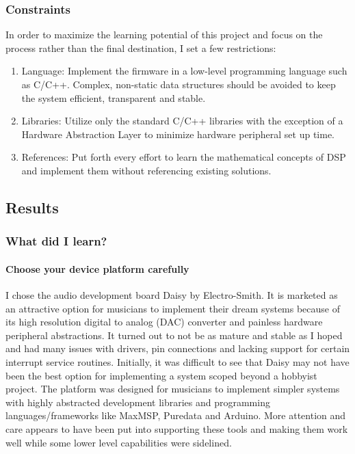 \documentclass[acmlarge,screen]{acmart}
\begin{document}
	\subsubsection{Constraints}
	In order to maximize the learning potential of this project and focus on the process rather than the final destination, I set a few restrictions:
	\begin{enumerate}
		\item Language: Implement the firmware in a low-level programming language such as C/C++. Complex, non-static data structures should be avoided to keep the system efficient, transparent and stable.
		\item Libraries: Utilize only the standard C/C++ libraries with the exception of a Hardware Abstraction Layer to minimize hardware peripheral set up time. 
		\item References: Put forth every effort to learn the mathematical concepts of DSP and implement them without referencing existing solutions.
	\end{enumerate}
	
\subsection{Results}
	\subsubsection{What did I learn?}
	
	\paragraph{Choose your device platform carefully} I chose the audio development board Daisy by Electro-Smith. It is marketed as an attractive option for musicians to implement their dream systems because of its high resolution digital to analog (DAC) converter and painless hardware peripheral abstractions. It turned out to not be as mature and stable as I hoped and had many issues with drivers, pin connections and lacking support for certain interrupt service routines. Initially, it was difficult to see that Daisy may not have been the best option for implementing a system scoped beyond a hobbyist project. The platform was designed for musicians to implement simpler systems with highly abstracted development libraries and programming languages/frameworks like MaxMSP, Puredata and Arduino. More attention and care appears to have been put into supporting these tools and making them work well while some lower level capabilities were sidelined.
	
\end{document}
